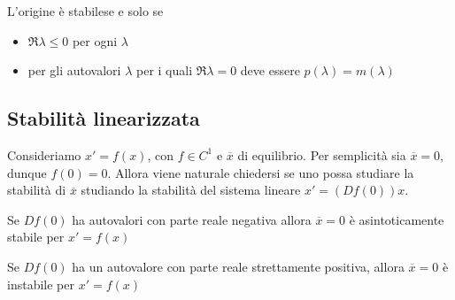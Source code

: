 \begin{theorem}
    L'origine è stabilese e solo se
\begin{itemize}[label = --]
    \item \(\Re \lambda \le 0\) per ogni \(\lambda\) 
    \item per gli autovalori \(\lambda\)  per i quali \(\Re \lambda = 0\) deve
        essere \(p{(\lambda)} = m {(\lambda)}\) 
\end{itemize}
\end{theorem}

\subsection{Stabilità linearizzata}
Consideriamo \(x'= f{(x)}\), con \(f \in C^{1}\) e \(\overline{x}\) di
equilibrio. Per semplicità sia \(\overline{x} = 0\), dunque \(f{(0)} = 0\).
Allora viene naturale chiedersi se uno possa studiare la stabilità di
\(\overline{x}\) studiando la stabilità del sistema lineare \(x'=
{(Df{(0)})}x\). 
\begin{theorem}
    Se \(Df{(0)}\) ha autovalori con parte reale negativa allora \(\overline{x} =
    0\) è asintoticamente stabile per \(x'= f{(x)}\) 
\end{theorem}
\begin{theorem}
    Se \(Df{(0)}\) ha un autovalore con parte reale strettamente positiva,
    allora \(\overline{x} = 0\) è instabile per \(x' = f{(x)}\) 
\end{theorem}

